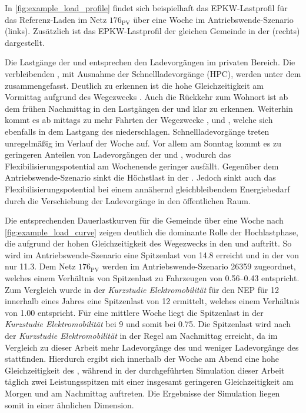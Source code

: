 

In \autoref{fig:example_load_profile} findet sich beispielhaft das \gls{EPKW}-Lastprofil für das Referenz-Laden im Netz \(176_{\text{PV}}\) über eine Woche im Antriebswende-Szenario (links).
Zusätzlich ist das \gls{EPKW}-Lastprofil der gleichen Gemeinde in der \SzeFirmenparkplatz (rechts) dargestellt.



Die Lastgänge der \UCs \zH und \Firmeparkplatz entsprechen den Ladevorgängen im privaten Bereich.
Die verbleibenden \UCsdot, mit Ausnahme der Schnellladevorgänge (\gls{HPC}), werden unter dem \UC \oeffen zusammengefasst.
Deutlich zu erkennen ist die hohe Gleichzeitigkeit am Vormittag aufgrund des Wegezwecks \Arbeitdot.
Auch die Rückkehr zum Wohnort ist ab dem frühen Nachmittag in den Lastgängen der \UCs \zH und \oeffen klar zu erkennen.
Weiterhin kommt es ab mittags zu mehr Fahrten der Wegezwecke \Einkaufdot, \Erledigung und \Freizeitdot, welche sich ebenfalls in dem Lastgang des \UC \oeffen niederschlagen.
Schnellladevorgänge treten unregelmäßig im Verlauf der Woche auf.
Vor allem am Sonntag kommt es zu geringeren Anteilen von Ladevorgängen der \UCs \zH und \Firmeparkplatzdot, wodurch das Flexibilisierungspotential am Wochenende geringer ausfällt.
Gegenüber dem Antriebswende-Szenario sinkt die Höchstlast in der \SzeFirmenparkplatzdot.
Jedoch sinkt auch das Flexibilisierungspotential bei einem annähernd gleichbleibendem Energiebedarf durch die Verschiebung der Ladevorgänge in den öffentlichen Raum.\medskip

Die entsprechenden Dauerlastkurven für die Gemeinde über eine Woche nach \autoref{fig:example_load_curve} zeigen deutlich die dominante Rolle der Hochlastphase, die aufgrund der hohen Gleichzeitigkeit des Wegezwecks \Arbeit in den \UCs \Firmeparkplatz und \Straszenrand auftritt.
So wird im Antriebswende-Szenario eine Spitzenlast von \SI{14.8}{\mw} erreicht und in der \SzeFirmenparkplatz von nur \SI{11.3}{\mw}.
Dem Netz \(176_{\text{PV}}\) werden im Antriebswende-Szenario \SI{26359}{\FZ} zugeordnet, welches einem Verhältnis von Spitzenlast zu Fahrzeugen von \SIrange[range-phrase=~bzw.~]{0.56}{0.43}{\kWperFZ} entspricht.
Zum Vergleich wurde in der \textit{Kurzstudie Elektromobilität} für den \gls{NEP} \cite{Ebner2019} für \SI{12}{\MioStk} innerhalb eines Jahres eine Spitzenlast von \SI{12}{\gw} ermittelt, welches einem Verhältnis von \SI{1.00}{\kWperFZ} entspricht.
Für eine mittlere Woche liegt die Spitzenlast in der \textit{Kurzstudie Elektromobilität} bei \SI{9}{\gw} und somit bei \SI{0.75}{\kWperFZ}.
Die Spitzenlast wird nach der \textit{Kurzstudie Elektromobilität} in der Regel am Nachmittag erreicht, da im Vergleich zu dieser Arbeit mehr Ladevorgänge des \UC \zH und weniger Ladevorgänge des \UC \Firmeparkplatz stattfinden.
Hierdurch ergibt sich innerhalb der Woche am Abend eine hohe Gleichzeitigkeit des \UC \zHdot, während in der durchgeführten Simulation dieser Arbeit täglich zwei Leistungsspitzen mit einer insgesamt geringeren Gleichzeitigkeit am Morgen und am Nachmittag auftreten.
Die Ergebnisse der Simulation liegen somit in einer ähnlichen Dimension.

